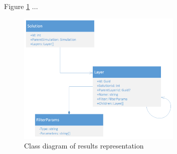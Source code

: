 

Figure \ref{fig:results-class-diagram} ...


\begin{figure}[H]
    \centering
    \includegraphics[width=0.7\textwidth]{figures/chapter-data-management/results-class-diagram}
    \decoRule
    \caption{Class diagram of results representation}
    \label{fig:results-class-diagram}
\end{figure}